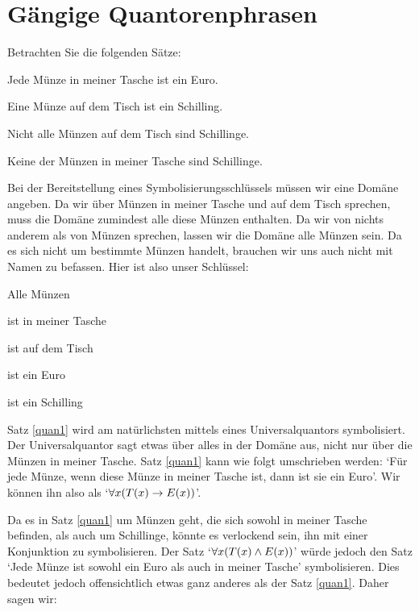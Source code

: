 \section{Gängige Quantorenphrasen}
Betrachten Sie die folgenden Sätze:
	\begin{earg}
		\item[\ex{quan1}] Jede Münze in meiner Tasche ist ein Euro.
		\item[\ex{quan2}] Eine Münze auf dem Tisch ist ein Schilling.
		\item[\ex{quan3}] Nicht alle Münzen auf dem Tisch sind Schillinge.
		\item[\ex{quan4}] Keine der Münzen in meiner Tasche sind Schillinge.
	\end{earg}
Bei der Bereitstellung eines Symbolisierungsschlüssels müssen wir eine Domäne angeben. Da wir über Münzen in meiner Tasche und auf dem Tisch sprechen, muss die Domäne zumindest alle diese Münzen enthalten. Da wir von nichts anderem als von Münzen sprechen, lassen wir die Domäne alle Münzen sein. Da es sich nicht um bestimmte Münzen handelt, brauchen wir uns auch nicht mit Namen zu befassen. Hier ist also unser Schlüssel:
	\begin{ekey}
		\item[\text{Domäne}] Alle Münzen
		\item[\atom{T}{x}]  ist in meiner Tasche %
		\item[\atom{T_2}{x}]  ist auf dem Tisch
		\item[\atom{E}{x}]  ist ein Euro
		\item[\atom{S}{x}]  ist ein Schilling
	\end{ekey}
Satz \ref{quan1} wird am natürlichsten mittels eines Universalquantors symbolisiert. Der Universalquantor sagt etwas über alles in der Domäne aus, nicht nur über die Münzen in meiner Tasche. Satz \ref{quan1} kann wie folgt umschrieben werden: `Für jede Münze, wenn diese Münze in meiner Tasche ist, dann ist sie ein Euro'. Wir können ihn also als `$\forall x(\mathord{T}(x) \rightarrow \mathord{E}(x))$'. 

Da es in Satz \ref{quan1} um Münzen geht, die sich sowohl in meiner Tasche befinden, als auch um Schillinge, könnte es verlockend sein, ihn mit einer Konjunktion zu symbolisieren. Der Satz `$\forall x(\mathord{T}(x) \wedge \mathord{E}(x))$' würde jedoch den Satz `Jede Münze ist sowohl ein Euro als auch in meiner Tasche' symbolisieren. Dies bedeutet jedoch offensichtlich etwas ganz anderes als der Satz \ref{quan1}. Daher sagen wir:

